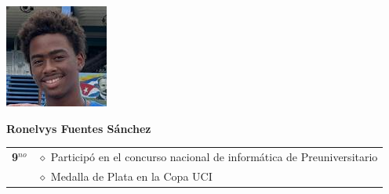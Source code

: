 \begin{minipage}{0.2\textwidth}
	\includegraphics[width=\linewidth]{img/concursantes/ronelvys.png} %
\end{minipage}
\hfill
\begin{minipage}{0.7\textwidth}
	\textbf{Ronelvys Fuentes Sánchez}
	
	\vspace*{0.1in}
	\begin{tabular}{rl}
		
		
		
		\textbf{9$^{no}$} 
		& $\diamond$ Participó en el concurso nacional de informática de Preuniversitario \\
		& $\diamond$ Medalla de Plata en la Copa UCI \\
		
		
		
	\end{tabular}
\end{minipage}

